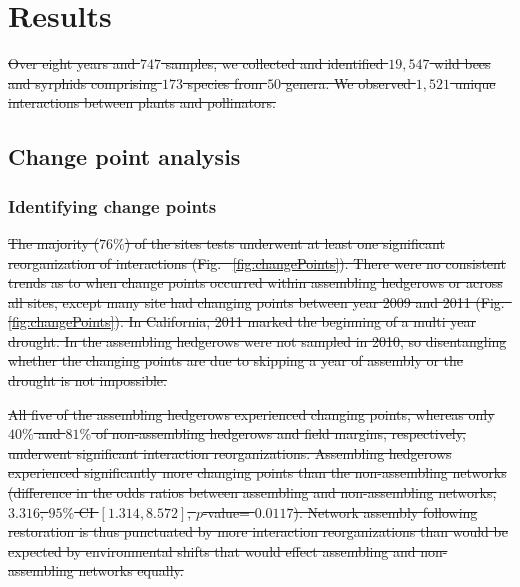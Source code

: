 \documentclass[12pt]{article}
\providecommand{\DIFdeltex}[1]{{\protect\color{red}\sout{#1}}}                      %
\providecommand{\DIFdelbegin}{} %
\providecommand{\DIFdelend}{} %
\providecommand{\DIFdel}[1]{\texorpdfstring{\DIFdeltex{#1}}{}} %
\begin{document}
\DIFdelbegin %

\DIFdelend \section*{Results}
\label{sec:results}
\DIFdelbegin %

\DIFdel{Over eight years and $747$ samples, we collected and identified
$19,547$ wild bees and syrphids comprising $173$ species from $50$
genera. We observed $1,521$ unique interactions between plants and
pollinators.
}%

\DIFdelend \subsection*{Change point analysis}
\subsubsection*{Identifying change points}

\DIFdelbegin \DIFdel{The majority ($76\%$) of the sites tests underwent at least one
significant reorganization of interactions (Fig.~
\ref{fig:changePoints}). There were no consistent trends as to when
change points occurred within assembling hedgerows or across all sites,
except many site had changing points between year 2009 and 2011 (Fig.~
\ref{fig:changePoints}). In California, 2011 marked the beginning of a
multi year drought. In the assembling hedgerows were not sampled in
2010, so disentangling whether the changing points are due to skipping
a year of assembly or the drought is not impossible.
}%

\DIFdel{All five of the assembling hedgerows experienced changing points,
whereas only $40\%$ and $81\%$ of non-assembling hedgerows and field
margins, respectively, underwent significant interaction
reorganizations. Assembling hedgerows experienced significantly more
changing points than the non-assembling networks (difference in the
odds ratios between assembling and non-assembling networks, $3.316$,
$95\%$ CI $[1.314, 8.572]$, $p$-value= $0.0117$). Network assembly
following restoration is thus punctuated by more interaction
reorganizations than would be expected by environmental shifts that
would effect assembling and non-assembling networks equally.
}%
\end{document}
